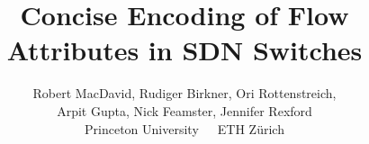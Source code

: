 \documentclass[10pt,twocolumn]{confpaper}
\date{}
\title{
{\ttlfnt Concise Encoding of Flow Attributes in SDN Switches}}
\author{
{\aufnt Robert MacDavid\ptn, Rudiger Birkner\et, Ori Rottenstreich\ptn,}\\
{\aufnt Arpit Gupta\ptn, Nick Feamster\ptn, Jennifer Rexford\ptn}\\
\ptn\normalsize{Princeton University}~~~\et\normalsize{ETH Z\"{u}rich}\\
}
\begin{document}
\maketitle
\thispagestyle{empty}


\begin{sloppypar}












\end{sloppypar}
\balance


%
\end{document}

